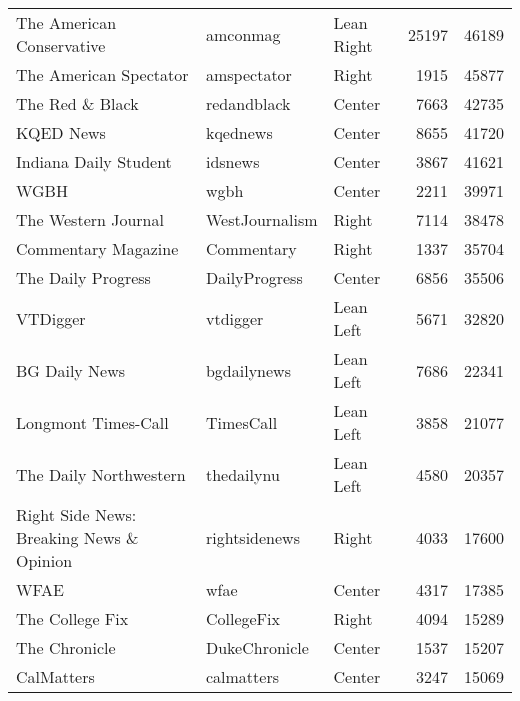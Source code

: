 \begin{tabular}{lllrr}
                The American Conservative &         amconmag &    Lean Right &             25197 &      46189 \\
                   The American Spectator &      amspectator &         Right &              1915 &      45877 \\
                          The Red \& Black &      redandblack &        Center &              7663 &      42735 \\
                                KQED News &         kqednews &        Center &              8655 &      41720 \\
                    Indiana Daily Student &          idsnews &        Center &              3867 &      41621 \\
                                     WGBH &             wgbh &        Center &              2211 &      39971 \\
                      The Western Journal &   WestJournalism &         Right &              7114 &      38478 \\
                      Commentary Magazine &       Commentary &         Right &              1337 &      35704 \\
                       The Daily Progress &    DailyProgress &        Center &              6856 &      35506 \\
                                 VTDigger &         vtdigger &     Lean Left &              5671 &      32820 \\
                            BG Daily News &      bgdailynews &     Lean Left &              7686 &      22341 \\
                      Longmont Times-Call &        TimesCall &     Lean Left &              3858 &      21077 \\
                   The Daily Northwestern &       thedailynu &     Lean Left &              4580 &      20357 \\
 Right Side News: Breaking News \& Opinion &    rightsidenews &         Right &              4033 &      17600 \\
                                     WFAE &             wfae &        Center &              4317 &      17385 \\
                          The College Fix &       CollegeFix &         Right &              4094 &      15289 \\
                            The Chronicle &    DukeChronicle &        Center &              1537 &      15207 \\
                               CalMatters &       calmatters &        Center &              3247 &      15069 \\
\bottomrule
\end{tabular}

